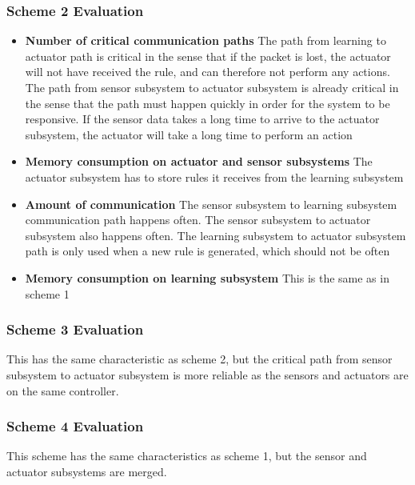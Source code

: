 \subsubsection{Scheme 2 Evaluation}
\begin{itemize}
\item \textbf{Number of critical communication paths} The path from learning to actuator path is critical in the sense that if the packet is lost, the actuator will not have received the rule, and can therefore not perform any actions. The path from sensor subsystem to actuator subsystem is already critical in the sense that the path must happen quickly in order for the system to be responsive. If the sensor data takes a long time to arrive to the actuator subsystem, the actuator will take a long time to perform an action
\item \textbf{Memory consumption on actuator and sensor subsystems} The actuator subsystem has to store rules it receives from the learning subsystem
\item \textbf{Amount of communication} The sensor subsystem to learning subsystem communication path happens often. The sensor subsystem to actuator subsystem also happens often. The learning subsystem to actuator subsystem path is only used when a new rule is generated, which should not be often
\item \textbf{Memory consumption on learning subsystem} This is the same as in scheme 1
\end{itemize}

\subsubsection{Scheme 3 Evaluation}
This has the same characteristic as scheme 2, but the critical path from sensor subsystem to actuator subsystem is more reliable as the sensors and actuators are on the same controller.

\subsubsection{Scheme 4 Evaluation}
This scheme has the same characteristics as scheme 1, but the sensor and actuator subsystems are merged.

